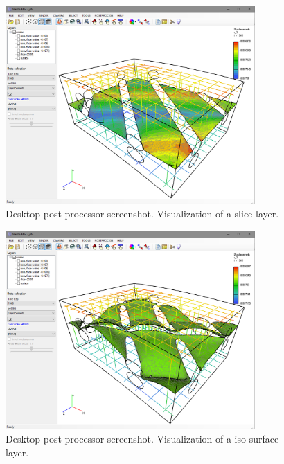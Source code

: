 \begin{figure}[H]
    \centering
    \includegraphics[width=0.85\textwidth]{figures/chapter-data-management/desktop-postprocessor-slice}
    \decoRule
    \caption{Desktop post-processor screenshot. Visualization of a slice layer.}
    \label{fig:desktop-postprocessor-slice}
\end{figure}

\begin{figure}[H]
    \centering
    \includegraphics[width=0.85\textwidth]{figures/chapter-data-management/desktop-postprocessor-isosurface}
    \decoRule
    \caption{Desktop post-processor screenshot. Visualization of a iso-surface layer.}
    \label{fig:desktop-postprocessor-isosurface}
\end{figure}


